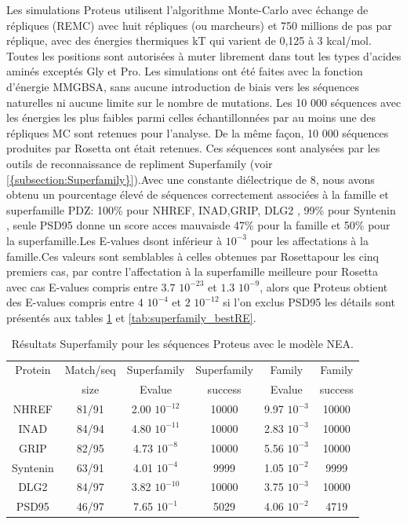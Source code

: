 Les simulations Proteus utilisent l'algorithme Monte-Carlo avec échange de répliques (REMC) avec huit répliques (ou marcheurs) et 750 millions de pas par réplique, avec des énergies thermiques kT  qui varient de 0,125 à 3 kcal/mol. Toutes les positions sont autorisées à muter librement dans tout les types d'acides aminés exceptés Gly et Pro. Les simulations ont été faites avec la fonction d'énergie MMGBSA, sans aucune introduction de biais vers les séquences naturelles ni aucune limite sur le nombre de mutations. Les 10 000 séquences avec les énergies les plus faibles parmi celles échantillonnées par au moins une des répliques MC sont retenues pour l'analyse. De la même façon, 10 000 séquences produites par Rosetta ont était retenues. Ces séquences sont analysées par les outils de reconnaissance de repliment \og Superfamily \fg (voir \ref{{subsection:Superfamily}}).Avec une constante diélectrique de 8, nous avons obtenu un pourcentage élevé de séquences correctement associées à la famille et superfamille PDZ: 100\% pour NHREF, INAD,GRIP, DLG2 , 99\%  pour Syntenin , seule PSD95 donne un score acces mauvaisde 47\% pour la famille et 50\% pour la superfamille.Les E-values dsont inférieur à $10^{-3}$ pour les affectations à la famille.Ces valeurs sont semblables à celles obtenues par Rosettapour les cinq premiers cas, par contre l'affectation à la superfamille meilleure pour Rosetta avec cas E-values compris entre $3.7$ $10^{-23}$ et $1.3$ $10^{-9}$, alors que Proteus obtient des E-values compris entre $4$ $10^{-4}$ et $2$ $10^{-12}$ si l'on exclus PSD95 les détails sont présentés aux tables \ref{tab:superfamily_model_B6} et \ref{tab:superfamily_bestRE}.


\begin{table}[h]
  
  \begin{tabular}{cccccc}
    
    \toprule
    Protein & Match/seq & Superfamily & Superfamily & Family & Family \\
            & size      & Evalue      & success     & Evalue & success\\
    \cmidrule{1-6}
    NHREF  & 81/91 &     2.00 $10^{-12}$ & 10000  & 9.97 $10^{-3}$ & 10000  \\
    INAD  & 84/94 &      4.80 $10^{-11}$ & 10000  & 2.83 $10^{-3}$ & 10000  \\
    GRIP  & 82/95 &      4.73 $10^{-8}$  & 10000  & 5.56 $10^{-3}$ & 10000  \\
    Syntenin  & 63/91 &  4.01 $10^{-4}$  &  9999  & 1.05 $10^{-2}$ &  9999  \\
    DLG2  & 84/97 &      3.82 $10^{-10}$ & 10000  & 3.75 $10^{-3}$ & 10000  \\
    PSD95  & 46/97 &     7.65 $10^{-1}$  &  5029  & 4.06 $10^{-2}$ &  4719  \\

    \bottomrule        
  \end{tabular}   
  \caption{Résultats Superfamily pour les séquences Proteus avec le modèle NEA.}   
  \label{tab:superfamily_model_B6}       
\end{table}

